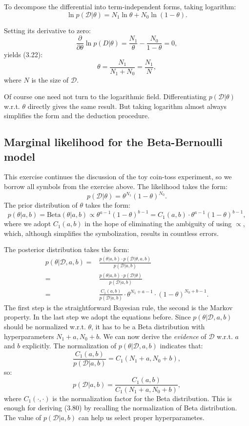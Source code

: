 \documentclass[UTF8]{ctexart}
\begin{document}
To decompose the differential into term-independent forms, taking logarithm:
$$\ln p(\mathcal{D}|\theta) = N_{1}\ln \theta + N_{0} \ln (1-\theta).$$

Setting its derivative to zero:
$$\frac{\partial}{\partial \theta} \ln p(D|\theta) = \frac{N_{1}}{\theta} -\frac{N_{0}}{1-\theta}=0,$$
yields (3.22):
$$\theta = \frac{N_{1}}{N_{1}+N_{0}}=\frac{N_{1}}{N},$$
where $N$ is the size of $\mathcal{D}$.

Of course one need not turn to the logarithmic field.
Differentiating $p(\mathcal{D}|\theta)$ w.r.t. $\theta$ directly gives the same result.
But taking logarithm almost always simplifies the form and the deduction procedure.

\subsection{Marginal likelihood for the Beta-Bernoulli model}
This exercise continues the discussion of the toy coin-toss experiment, so we borrow all symbols from the exercise above.
The likelihood takes the form:
$$p(\mathcal{D}|\theta) = \theta^{N_{1}}(1-\theta)^{N_{0}}.$$
The prior distribution of $\theta$ takes the form:
$$p(\theta|a,b)=\text{Beta}(\theta|a,b)\propto \theta^{a-1}(1-\theta)^{b-1}=C_{1}(a,b)\cdot \theta^{a-1}(1-\theta)^{b-1},$$
where we adopt $C_{1}(a,b)$ in the hope of eliminating the ambiguity of using $\propto$, which, although simplifies the symbolization, results in countless errors.

The posterior distribution takes the form:
$$
\begin{aligned}
p(\theta|\mathcal{D},a,b) =& \frac{p(\theta|a,b)\cdot p(\mathcal{D}|\theta,a,b)}{p(\mathcal{D}|a,b)} \\
=&\frac{p(\theta|a,b)\cdot p(\mathcal{D}|\theta)}{p(\mathcal{D}|a,b)} \\
=&\frac{C_{1}(a,b)}{p(\mathcal{D}|a,b)}\cdot \theta^{N_{1}+a-1}\cdot (1-\theta)^{N_{0}+b-1}.\nonumber
\end{aligned}
$$
The first step is the straightforward Bayesian rule, the second is the Markov property.
In the last step we adopt the equations before.
Since $p(\theta|\mathcal{D},a,b)$ should be normalized w.r.t. $\theta$, it has to be a Beta distribution with hyperparameters $N_{1}+a,N_{0}+b$.
We can now derive the \emph{evidence} of $\mathcal{D}$ w.r.t. $a$ and $b$ explicitly.
The normalization of $p(\theta|\mathcal{D},a,b)$ indicates that:
$$\frac{C_{1}(a,b)}{p(\mathcal{D}|a,b)}=C_{1}(N_{1}+a,N_{0}+b),$$
so:
$$p(\mathcal{D}|a,b)=\frac{C_{1}(a,b)}{C_{1}(N_{1}+a,N_{0}+b)},$$
where $C_{1}(\cdot,\cdot)$ is the normalization factor for the Beta distribution.
This is enough for deriving (3.80) by recalling the normalization of Beta distribution.
The value of $p(\mathcal{D}|a,b)$ can help us select proper hyperparametes.
\end{document}
